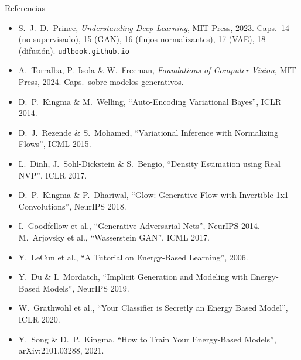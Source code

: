\documentclass[aspectratio=169, 10pt]{beamer}
\begin{document}
\begin{frame}{Referencias}

	\small
	\begin{itemize}
		\item S.\ J.\ D.\ Prince, \textit{Understanding Deep Learning}, MIT Press, 2023. Caps.\ 14 (no supervisado), 15 (GAN), 16 (flujos normalizantes), 17 (VAE), 18 (difusi\'on). \texttt{udlbook.github.io}
		\item A.\ Torralba, P.\ Isola \& W.\ Freeman, \textit{Foundations of Computer Vision}, MIT Press, 2024. Caps.\ sobre modelos generativos.
		\item D.\ P.\ Kingma \& M.\ Welling, ``Auto-Encoding Variational Bayes'', ICLR 2014.
		\item D.\ J.\ Rezende \& S.\ Mohamed, ``Variational Inference with Normalizing Flows'', ICML 2015.
		\item L.\ Dinh, J.\ Sohl-Dickstein \& S.\ Bengio, ``Density Estimation using Real NVP'', ICLR 2017.
		\item D.\ P.\ Kingma \& P.\ Dhariwal, ``Glow: Generative Flow with Invertible 1x1 Convolutions'', NeurIPS 2018.
		\item I.\ Goodfellow et al., ``Generative Adversarial Nets'', NeurIPS 2014. \quad M.\ Arjovsky et al., ``Wasserstein GAN'', ICML 2017.
		\item Y.\ LeCun et al., ``A Tutorial on Energy-Based Learning'', 2006.
		\item Y.\ Du \& I.\ Mordatch, ``Implicit Generation and Modeling with Energy-Based Models'', NeurIPS 2019.
		\item W.\ Grathwohl et al., ``Your Classifier is Secretly an Energy Based Model'', ICLR 2020.
		\item Y.\ Song \& D.\ P.\ Kingma, ``How to Train Your Energy-Based Models'', arXiv:2101.03288, 2021.
	\end{itemize}

\end{frame}
\end{document}
